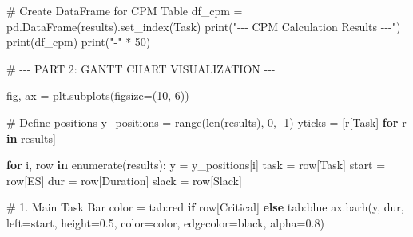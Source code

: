 \documentclass[
  letterpaper,
  DIV=11,
  numbers=noendperiod]{scrreprt}
\newenvironment{Shaded}{\begin{snugshade}}{\end{snugshade}}
\newcommand{\BuiltInTok}[1]{\textcolor[rgb]{0.00,0.23,0.31}{#1}}
\newcommand{\CommentTok}[1]{\textcolor[rgb]{0.37,0.37,0.37}{#1}}
\newcommand{\ControlFlowTok}[1]{\textcolor[rgb]{0.00,0.23,0.31}{\textbf{#1}}}
\newcommand{\DecValTok}[1]{\textcolor[rgb]{0.68,0.00,0.00}{#1}}
\newcommand{\FloatTok}[1]{\textcolor[rgb]{0.68,0.00,0.00}{#1}}
\newcommand{\KeywordTok}[1]{\textcolor[rgb]{0.00,0.23,0.31}{\textbf{#1}}}
\newcommand{\NormalTok}[1]{\textcolor[rgb]{0.00,0.23,0.31}{#1}}
\newcommand{\OperatorTok}[1]{\textcolor[rgb]{0.37,0.37,0.37}{#1}}
\newcommand{\StringTok}[1]{\textcolor[rgb]{0.13,0.47,0.30}{#1}}
\begin{document}
\begin{Shaded}
\begin{Highlighting}[]
\CommentTok{\# Create DataFrame for CPM Table}
\NormalTok{df\_cpm }\OperatorTok{=}\NormalTok{ pd.DataFrame(results).set\_index(}\StringTok{\textquotesingle{}Task\textquotesingle{}}\NormalTok{)}
\BuiltInTok{print}\NormalTok{(}\StringTok{"{-}{-}{-} CPM Calculation Results {-}{-}{-}"}\NormalTok{)}
\BuiltInTok{print}\NormalTok{(df\_cpm)}
\BuiltInTok{print}\NormalTok{(}\StringTok{"{-}"} \OperatorTok{*} \DecValTok{50}\NormalTok{)}

\CommentTok{\# {-}{-}{-} PART 2: GANTT CHART VISUALIZATION {-}{-}{-}}

\NormalTok{fig, ax }\OperatorTok{=}\NormalTok{ plt.subplots(figsize}\OperatorTok{=}\NormalTok{(}\DecValTok{10}\NormalTok{, }\DecValTok{6}\NormalTok{))}

\CommentTok{\# Define positions}
\NormalTok{y\_positions }\OperatorTok{=} \BuiltInTok{range}\NormalTok{(}\BuiltInTok{len}\NormalTok{(results), }\DecValTok{0}\NormalTok{, }\OperatorTok{{-}}\DecValTok{1}\NormalTok{)}
\NormalTok{yticks }\OperatorTok{=}\NormalTok{ [r[}\StringTok{\textquotesingle{}Task\textquotesingle{}}\NormalTok{] }\ControlFlowTok{for}\NormalTok{ r }\KeywordTok{in}\NormalTok{ results]}

\ControlFlowTok{for}\NormalTok{ i, row }\KeywordTok{in} \BuiltInTok{enumerate}\NormalTok{(results):}
\NormalTok{    y }\OperatorTok{=}\NormalTok{ y\_positions[i]}
\NormalTok{    task }\OperatorTok{=}\NormalTok{ row[}\StringTok{\textquotesingle{}Task\textquotesingle{}}\NormalTok{]}
\NormalTok{    start }\OperatorTok{=}\NormalTok{ row[}\StringTok{\textquotesingle{}ES\textquotesingle{}}\NormalTok{]}
\NormalTok{    dur }\OperatorTok{=}\NormalTok{ row[}\StringTok{\textquotesingle{}Duration\textquotesingle{}}\NormalTok{]}
\NormalTok{    slack }\OperatorTok{=}\NormalTok{ row[}\StringTok{\textquotesingle{}Slack\textquotesingle{}}\NormalTok{]}
    
    \CommentTok{\# 1. Main Task Bar}
\NormalTok{    color }\OperatorTok{=} \StringTok{\textquotesingle{}tab:red\textquotesingle{}} \ControlFlowTok{if}\NormalTok{ row[}\StringTok{\textquotesingle{}Critical\textquotesingle{}}\NormalTok{] }\ControlFlowTok{else} \StringTok{\textquotesingle{}tab:blue\textquotesingle{}}
\NormalTok{    ax.barh(y, dur, left}\OperatorTok{=}\NormalTok{start, height}\OperatorTok{=}\FloatTok{0.5}\NormalTok{, color}\OperatorTok{=}\NormalTok{color, edgecolor}\OperatorTok{=}\StringTok{\textquotesingle{}black\textquotesingle{}}\NormalTok{, alpha}\OperatorTok{=}\FloatTok{0.8}\NormalTok{)}
    

\end{Highlighting}
\end{Shaded}
\end{document}
